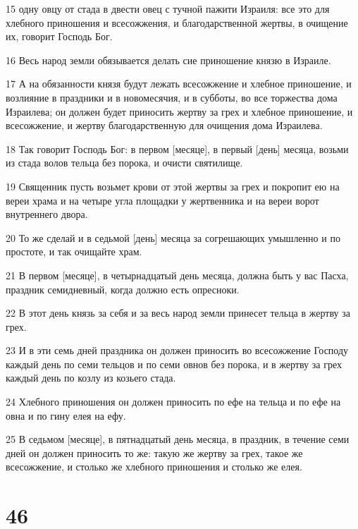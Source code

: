 \par 15 одну овцу от стада в двести овец с тучной пажити Израиля: все это для хлебного приношения и всесожжения, и благодарственной жертвы, в очищение их, говорит Господь Бог.
\par 16 Весь народ земли обязывается делать сие приношение князю в Израиле.
\par 17 А на обязанности князя будут лежать всесожжение и хлебное приношение, и возлияние в праздники и в новомесячия, и в субботы, во все торжества дома Израилева; он должен будет приносить жертву за грех и хлебное приношение, и всесожжение, и жертву благодарственную для очищения дома Израилева.
\par 18 Так говорит Господь Бог: в первом [месяце], в первый [день] месяца, возьми из стада волов тельца без порока, и очисти святилище.
\par 19 Священник пусть возьмет крови от этой жертвы за грех и покропит ею на вереи храма и на четыре угла площадки у жертвенника и на вереи ворот внутреннего двора.
\par 20 То же сделай и в седьмой [день] месяца за согрешающих умышленно и по простоте, и так очищайте храм.
\par 21 В первом [месяце], в четырнадцатый день месяца, должна быть у вас Пасха, праздник семидневный, когда должно есть опресноки.
\par 22 В этот день князь за себя и за весь народ земли принесет тельца в жертву за грех.
\par 23 И в эти семь дней праздника он должен приносить во всесожжение Господу каждый день по семи тельцов и по семи овнов без порока, и в жертву за грех каждый день по козлу из козьего стада.
\par 24 Хлебного приношения он должен приносить по ефе на тельца и по ефе на овна и по гину елея на ефу.
\par 25 В седьмом [месяце], в пятнадцатый день месяца, в праздник, в течение семи дней он должен приносить то же: такую же жертву за грех, такое же всесожжение, и столько же хлебного приношения и столько же елея.

\chapter{46}

